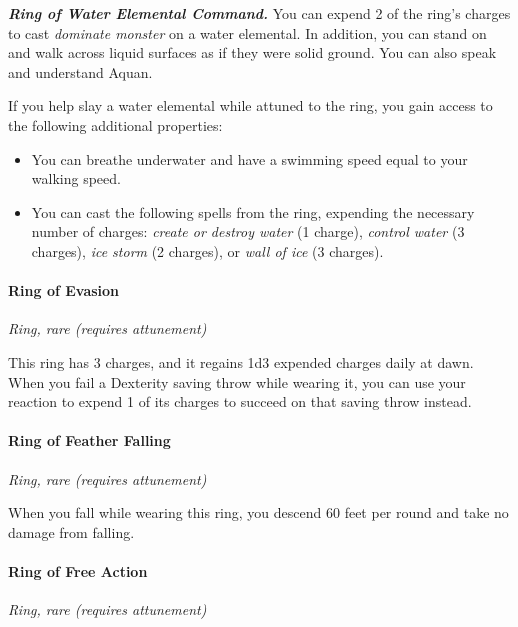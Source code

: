\documentclass[
]{article}
\providecommand{\tightlist}{%
  \setlength{\itemsep}{0pt}\setlength{\parskip}{0pt}}
\begin{document}
\emph{\textbf{Ring of Water Elemental Command.}} You can expend 2 of the
ring's charges to cast \emph{dominate monster} on a water elemental. In
addition, you can stand on and walk across liquid surfaces as if they
were solid ground. You can also speak and understand Aquan.

If you help slay a water elemental while attuned to the ring, you gain
access to the following additional properties:

\begin{itemize}
\tightlist
\item
  You can breathe underwater and have a swimming speed equal to your
  walking speed.
\item
  You can cast the following spells from the ring, expending the
  necessary number of charges: \emph{create or destroy water} (1
  charge), \emph{control water} (3 charges), \emph{ice storm} (2
  charges), or \emph{wall of ice} (3 charges).
\end{itemize}

\hypertarget{ring-of-evasion}{%
\paragraph{Ring of Evasion}\label{ring-of-evasion}}

\emph{Ring, rare (requires attunement)}

This ring has 3 charges, and it regains 1d3 expended charges daily at
dawn. When you fail a Dexterity saving throw while wearing it, you can
use your reaction to expend 1 of its charges to succeed on that saving
throw instead.

\hypertarget{ring-of-feather-falling}{%
\paragraph{Ring of Feather Falling}\label{ring-of-feather-falling}}

\emph{Ring, rare (requires attunement)}

When you fall while wearing this ring, you descend 60 feet per round and
take no damage from falling.

\hypertarget{ring-of-free-action}{%
\paragraph{Ring of Free Action}\label{ring-of-free-action}}

\emph{Ring, rare (requires attunement)}
\end{document}
